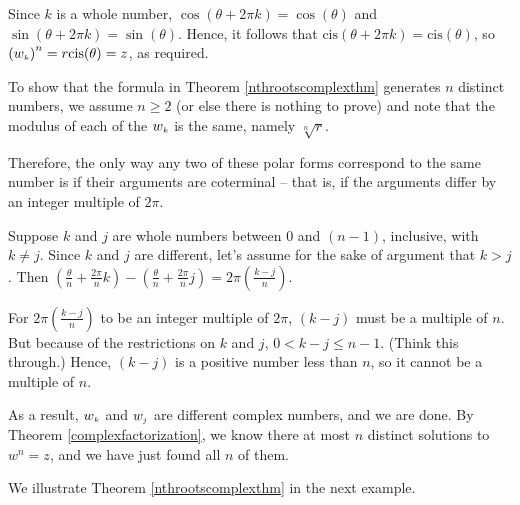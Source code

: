 \documentclass{ximera}
\begin{document}
Since $k$ is a whole number, $\cos(\theta + 2\pi k) = \cos(\theta)$ and $\sin(\theta + 2\pi k) = \sin(\theta)$. Hence, it follows that $\text{cis}(\theta + 2\pi k) = \text{cis}(\theta)$, so $\left(w_{\text{\tiny$k$}}\right)^n = r \text{cis}(\theta) = z$, as required.  

\smallskip

To show that the formula in Theorem  \ref{nthrootscomplexthm} generates $n$ distinct numbers, we assume $n \geq 2$ (or else there is nothing to prove) and note that the modulus of each of the  $w_{\text{\tiny$k$}}$  is the same, namely $\sqrt[n]{r}$.  

\smallskip

Therefore, the only way any two of these polar forms correspond to  the same number is if their arguments are coterminal -- that is, if the arguments differ by an integer multiple of $2\pi$. 

\smallskip

Suppose $k$ and $j$ are whole numbers between $0$ and $(n-1)$, inclusive,  with $k \neq j$.  Since $k$ and $j$ are different, let's assume for the sake of argument that  $k > j$.  Then $\left( \frac{\theta}{n} + \frac{2\pi}{n} k \right)  - \left( \frac{\theta}{n} + \frac{2\pi}{n} j \right) = 2\pi \left(\frac{k-j}{n}\right)$. 

\smallskip

For $2\pi \left(\frac{k-j}{n}\right)$ to be an integer multiple of $2\pi$, $(k-j)$ must be a multiple of $n$.  But because of the restrictions on $k$ and $j$, $0 < k - j \leq n-1$. (Think this through.)  Hence, $(k-j)$ is a positive number less  than $n$, so it cannot be a multiple of $n$.  

\smallskip

As a result, $w_{\text{\tiny$k$}}$ and $w_{\text{\tiny$j$}}$ are different complex numbers, and we are done.  By Theorem  \ref{complexfactorization}, we know there at most $n$ distinct solutions to $w^{n} = z$, and we have just found all $n$ of them.   

\smallskip

We illustrate Theorem \ref{nthrootscomplexthm} in the next example.
\end{document}
